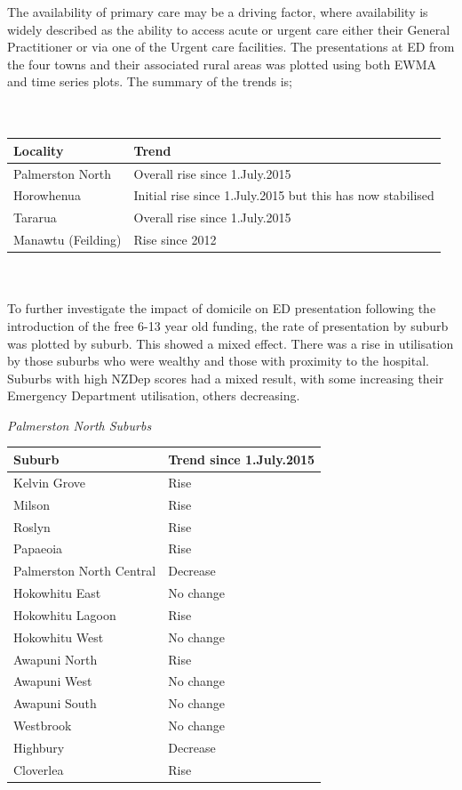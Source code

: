 \documentclass[11pt,a4paper]{article}
\begin{document}
The availability of primary care may be a driving factor, where availability is widely described as the ability to access acute or urgent care either their General Practitioner or via one of the Urgent care facilities. The presentations at ED from the four towns and their associated rural areas was plotted using both EWMA and time series plots. The summary of the trends is;\\ 
\\
\\
\begin{tabular}{|l|l|}
\hline 
	Locality & Trend\\
\hline
	Palmerston North & Overall rise since 1.July.2015\\
\hline
	Horowhenua & Initial rise since 1.July.2015 but this has now stabilised\\
\hline
	Tararua & Overall rise since 1.July.2015\\
\hline
	Manawtu (Feilding) & Rise since 2012\\
\hline
\end{tabular}
\\
\\
To further investigate the impact of domicile on ED presentation following the introduction of the free 6-13 year old funding, the rate of presentation by suburb was plotted by suburb. This showed a mixed effect. There was a rise in utilisation by those suburbs who were wealthy and those with proximity to the hospital. Suburbs with high NZDep scores had a mixed result, with some increasing their Emergency Department utilisation, others decreasing.
\pagebreak

\emph{Palmerston North Suburbs}

\begin{tabular}{|l|l|}
\hline
	Suburb & Trend since 1.July.2015\\
\hline
	Kelvin Grove & Rise\\
\hline
	Milson & Rise\\
\hline
	Roslyn & Rise\\
\hline
	Papaeoia & Rise\\
\hline
	Palmerston North Central & Decrease\\
\hline
	Hokowhitu East & No change\\
\hline
	Hokowhitu Lagoon & Rise\\
\hline
	Hokowhitu West & No change\\
\hline
	Awapuni North & Rise\\
\hline
	Awapuni West & No change\\
\hline
	Awapuni South & No change\\
\hline
	Westbrook & No change\\
\hline
	Highbury & Decrease\\
\hline
	Cloverlea & Rise\\
\hline
\end{tabular}
\\
\\
\end{document}
